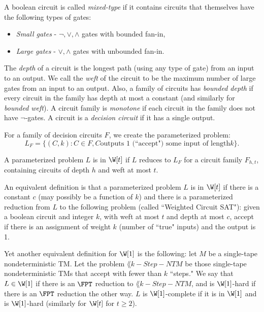 \begin{definition}
A boolean circuit is called \emph{mixed-type} if it contains circuits that themselves have the following types of gates:
\begin{itemize}
\item \emph{Small gates} - $\neg, \vee, \wedge$ gates with bounded fan-in,
\item \emph{Large gates} - $\vee, \wedge$ gates with unbounded fan-in.
\end{itemize}
The \emph{depth} of a circuit is the longest path (using any type of gate) from an input to an output. We call the \emph{weft} of the circuit to be the maximum number of large gates from an input to an output. Also, a family of circuits has \emph{bounded depth} if every circuit in the family has depth at most a constant (and similarly for \emph{bounded weft}). A circuit family is \emph{monotone} if each circuit in the family does not have $\neg$-gates. A circuit is a \emph{decision circuit} if it has a single output.
\end{definition}

\begin{definition}
For a family of decision circuits $F$, we create the parameterized problem:
\[
L_F = \{(C, k) : C \in F, C \text{outputs 1 (``accept") some input of length} k\}.
\]
\end{definition}

\begin{definition}[$\W$ Hierarchy]
A parameterized problem $L$ is in $\W[t]$ if $L$ reduces to $L_F$ for a circuit family $F_{h, t}$, containing circuits of depth $h$ and weft at most $t$.

\par An equivalent definition is that a parameterized problem $L$ is in $\W[t]$ if there is a constant $c$ (may possibly be a function of $k$) and there is a parameterized reduction from $L$ to the following problem (called ``Weighted Circuit SAT"): given a boolean circuit and integer $k$, with weft at most $t$ and depth at most $c$, accept if there is an assignment of weight $k$ (number of ``true" inputs) and the output is 1.

\par Yet another equivalent definition for $\W[1]$ is the following: let $M$ be a single-tape nondeterministic TM. Let the problem $\lang{k-Step-NTM}$ be those single-tape nondeterministic TMs that accept with fewer than $k$ ``steps." We say that $L \in \W[1]$ if there is an $\FPT$ reduction to $\lang{k-Step-NTM}$, and is $\W[1]$-hard if there is an $\FPT$ reduction the other way. $L$ is $\W[1]$-complete if it is in $\W[1]$ and is $\W[1]$-hard (similarly for $\W[t]$ for $t \ge 2$).
\end{definition}

